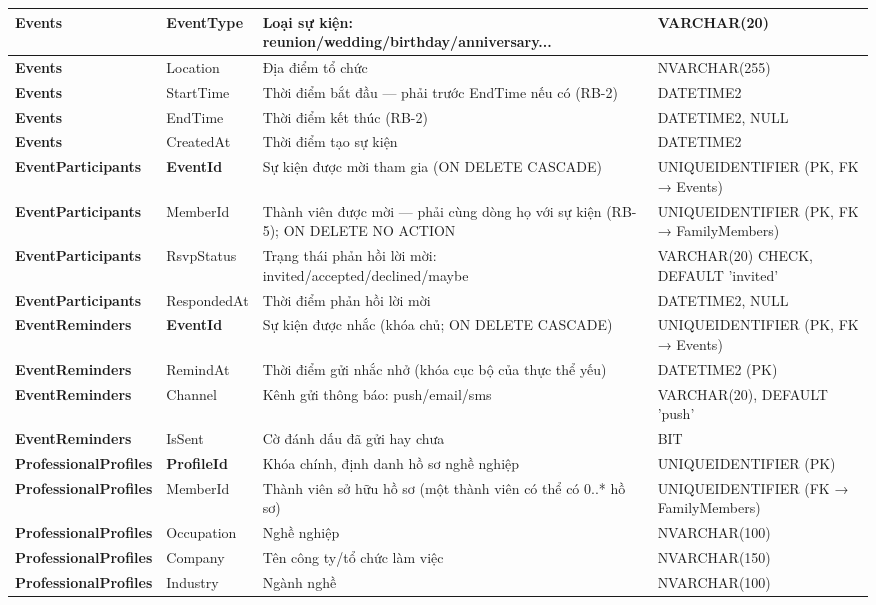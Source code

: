 \begin{longtable}{|p{}|p{}|p{}|p{}|}
\textbf{Events} & EventType & Loại sự kiện: reunion/wedding/birthday/anniversary... & VARCHAR(20) \\ \hline
\textbf{Events} & Location & Địa điểm tổ chức & NVARCHAR(255) \\ \hline
\textbf{Events} & StartTime & Thời điểm bắt đầu — phải trước EndTime nếu có (RB-2) & DATETIME2 \\ \hline
\textbf{Events} & EndTime & Thời điểm kết thúc (RB-2) & DATETIME2, NULL \\ \hline
\textbf{Events} & CreatedAt & Thời điểm tạo sự kiện & DATETIME2 \\ \hline
\textbf{EventParticipants} & \textbf{EventId} & Sự kiện được mời tham gia (ON DELETE CASCADE) & UNIQUEIDENTIFIER (PK, FK → Events) \\ \hline
\textbf{EventParticipants} & MemberId & Thành viên được mời — phải cùng dòng họ với sự kiện (RB-5); ON DELETE NO ACTION & UNIQUEIDENTIFIER (PK, FK → FamilyMembers) \\ \hline
\textbf{EventParticipants} & RsvpStatus & Trạng thái phản hồi lời mời: invited/accepted/declined/maybe & VARCHAR(20) CHECK, DEFAULT 'invited' \\ \hline
\textbf{EventParticipants} & RespondedAt & Thời điểm phản hồi lời mời & DATETIME2, NULL \\ \hline
\textbf{EventReminders} & \textbf{EventId} & Sự kiện được nhắc (khóa chủ; ON DELETE CASCADE) & UNIQUEIDENTIFIER (PK, FK → Events) \\ \hline
\textbf{EventReminders} & RemindAt & Thời điểm gửi nhắc nhở (khóa cục bộ của thực thể yếu) & DATETIME2 (PK) \\ \hline
\textbf{EventReminders} & Channel & Kênh gửi thông báo: push/email/sms & VARCHAR(20), DEFAULT 'push' \\ \hline
\textbf{EventReminders} & IsSent & Cờ đánh dấu đã gửi hay chưa & BIT \\ \hline
\textbf{ProfessionalProfiles} & \textbf{ProfileId} & Khóa chính, định danh hồ sơ nghề nghiệp & UNIQUEIDENTIFIER (PK) \\ \hline
\textbf{ProfessionalProfiles} & MemberId & Thành viên sở hữu hồ sơ (một thành viên có thể có 0..* hồ sơ) & UNIQUEIDENTIFIER (FK → FamilyMembers) \\ \hline
\textbf{ProfessionalProfiles} & Occupation & Nghề nghiệp & NVARCHAR(100) \\ \hline
\textbf{ProfessionalProfiles} & Company & Tên công ty/tổ chức làm việc & NVARCHAR(150) \\ \hline
\textbf{ProfessionalProfiles} & Industry & Ngành nghề & NVARCHAR(100) \\ \hline

\end{longtable}
